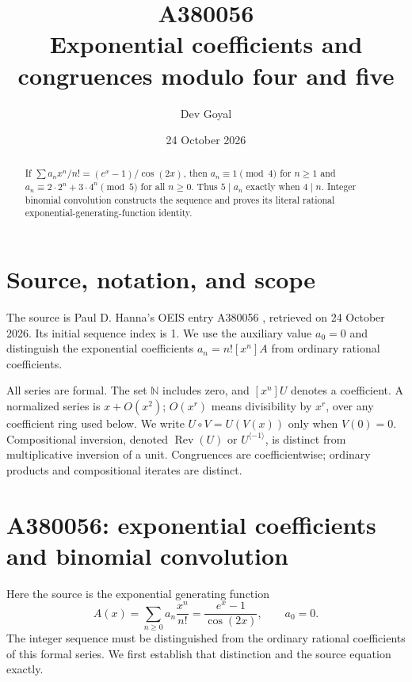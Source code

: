 \documentclass[11pt,a4paper]{article}
\title{A380056\\[4pt]\large Exponential coefficients and congruences modulo four and five}
\author{Dev Goyal}
\date{24 October 2026}
\theoremstyle{remark}
\newcommand{\N}{\mathbb N}
\newcommand{\Rev}{\operatorname{Rev}}
\newcommand{\rev}{^{\langle-1\rangle}}
\begin{document}
\maketitle
\begin{center}
\end{center}
\begin{abstract}
If $\sum a_nx^n/n!=(e^x-1)/\cos(2x)$, then $a_n\equiv1\pmod4$ for $n\ge1$ and $a_n\equiv2\cdot2^n+3\cdot4^n\pmod5$ for all $n\ge0$. Thus $5\mid a_n$ exactly when $4\mid n$. Integer binomial convolution constructs the sequence and proves its literal rational exponential-generating-function identity.
\end{abstract}

\section{Source, notation, and scope}

The source is Paul D. Hanna's OEIS entry A380056 \cite{oeis056},
retrieved on 24 October 2026. Its initial sequence index is 1.
We use the auxiliary value $a_0=0$ and distinguish the exponential
coefficients $a_n=n![x^n]A$ from ordinary rational coefficients.

All series are formal. The set $\N$ includes zero, and $[x^n]U$ denotes a
coefficient. A normalized series is $x+O(x^2)$; $O(x^r)$ means divisibility
by $x^r$, over any coefficient ring used below. We write $U\circ V=U(V(x))$
only when $V(0)=0$. Compositional inversion, denoted $\Rev(U)$ or $U\rev$,
is distinct from multiplicative inversion of a unit. Congruences are
coefficientwise; ordinary products and compositional iterates are distinct.

\section{A380056: exponential coefficients and binomial convolution}

Here the source is the exponential generating function
\cite{oeis056}
\[
 A(x)=\sum_{n\ge0}a_n\frac{x^n}{n!}
     =\frac{e^x-1}{\cos(2x)},\qquad a_0=0. \tag{1}
\]
The integer sequence must be distinguished from the ordinary rational
coefficients of this formal series. We first establish that distinction
and the source equation exactly.
\end{document}
